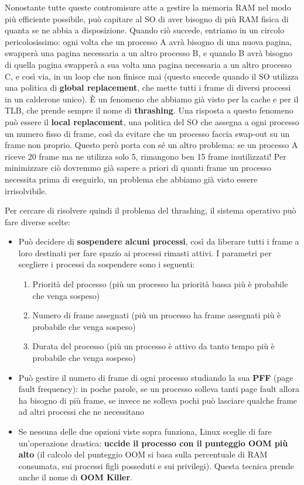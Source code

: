 \documentclass[11pt, a4paper, titlepage, oneside]{scrbook}
\begin{document}
Nonostante tutte queste contromisure atte a gestire la memoria RAM nel modo più efficiente possibile, può capitare al SO di aver bisogno di più RAM fisica di quanta se ne abbia a disposizione. Quando ciò succede, entriamo in un circolo pericolosissimo: ogni volta che un processo A avrà bisogno di una nuova pagina, swapperà una pagina necessaria a un altro processo B, e quando B avrà bisogno di quella pagina swapperà a sua volta una pagina necessaria a un altro processo C, e così via, in un loop che non finisce mai (questo succede quando il SO utilizza una politica di \textbf{global replacement}, che mette tutti i frame di diversi processi in un calderone unico). È un fenomeno che abbiamo già visto per la cache e per il TLB, che prende sempre il nome di \textbf{thrashing}. Una risposta a questo fenomeno può essere il \textbf{local replacement}, una politica del SO che assegna a ogni processo un numero fisso di frame, così da evitare che un processo faccia swap-out su un frame non proprio. Questo però porta con sé un altro problema: se un processo A riceve 20 frame ma ne utilizza solo 5, rimangono ben 15 frame inutilizzati! Per minimizzare ciò dovremmo già sapere a priori di quanti frame un processo necessita prima di eseguirlo, un problema che abbiamo già visto essere irrisolvibile. 

Per cercare di risolvere quindi il problema del thrashing, il sistema operativo può fare diverse scelte:
\begin{itemize}
    \item Può decidere di \textbf{sospendere alcuni processi}, così da liberare tutti i frame a loro destinati per fare spazio ai processi rimasti attivi. I parametri per scegliere i processi da sospendere sono i seguenti:
    \begin{enumerate}
        \item Priorità del processo (più un processo ha priorità bassa più è probabile che venga sospeso)
        \item Numero di frame assegnati (più un processo ha frame assegnati più è probabile che venga sospeso)
        \item Durata del processo (più un processo è attivo da tanto tempo più è probabile che venga sospeso)
    \end{enumerate}
    \item Può gestire il numero di frame di ogni processo studiando la sua \textbf{PFF} (page fault frequency): in poche parole, se un processo solleva tanti page fault allora ha bisogno di più frame, se invece ne solleva pochi può lasciare qualche frame ad altri processi che ne necessitano
    \item Se nessuna delle due opzioni viste sopra funziona, Linux sceglie di fare un'operazione drastica: \textbf{uccide il processo con il punteggio OOM più alto} (il calcolo del punteggio OOM si basa sulla percentuale di RAM consumata, sui processi figli posseduti e sui privilegi). Questa tecnica prende anche il nome di \textbf{OOM Killer}.
\end{itemize}
\end{document}
